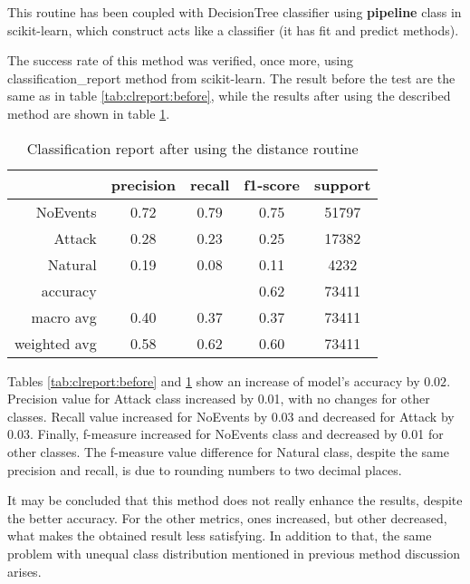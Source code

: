 This routine has been coupled with DecisionTree classifier using \textbf{pipeline} class in scikit-learn, which construct acts like a classifier (it has fit and predict methods). 

The success rate of this method was verified, once more, using classification\_report method from scikit-learn. The result before the test are the same as in table \ref{tab:clreport:before}, while the results after using the described method are shown in table \ref{tab:distrep}.

\begin{table}[H]
    \centering
    \caption{Classification report after using the distance routine} \label{tab:distrep}
    \begin{tabular}{rcccc}\toprule
     &   precision    &recall & f1-score &  support  \\\midrule

        NoEvents    &   0.72   &   0.79   &   0.75  &   51797 \\
          Attack    &   0.28   &   0.23   &   0.25  &   17382 \\
         Natural   &    0.19   &   0.08   &   0.11  &    4232 \\
    
        accuracy    &           &         &   0.62   &  73411 \\
       macro avg    &   0.40    &  0.37   &   0.37  &   73411 \\
    weighted avg   &   0.58   &   0.62   &   0.60   &  73411   \\  \bottomrule
    \end{tabular}
\end{table}

Tables \ref{tab:clreport:before} and \ref{tab:distrep} show an increase of model's accuracy by $0.02$. Precision value for Attack class increased by 0.01, with no changes for other classes. Recall value increased for NoEvents by 0.03 and decreased for Attack by 0.03. Finally, f-measure increased for NoEvents class and decreased by 0.01 for other classes. The f-measure value difference for Natural class, despite the same precision and recall, is due to rounding numbers to two decimal places. 

It may be concluded that this method does not really enhance the results, despite the better accuracy. For the other metrics, ones increased, but other decreased, what makes the obtained result less satisfying. In addition to that, the same problem with unequal class distribution mentioned in previous method discussion arises. 

